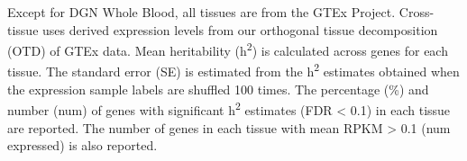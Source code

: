 \documentclass[10pt,letterpaper]{article}
\begin{document}
\begin{table}[!ht]
\begin{adjustwidth}{-2.25in}{0in}
\begin{tabular}{lrlrrr}
\end{tabular}
\begin{flushleft} Except for DGN Whole Blood, all tissues are from the GTEx Project. Cross-tissue uses derived expression levels from our orthogonal tissue decomposition (OTD) of GTEx data. Mean heritability (h\textsuperscript{2}) is calculated across genes for each tissue. The standard error (SE) is estimated from the h\textsuperscript{2} estimates obtained when the expression sample labels are shuffled 100 times. The percentage (\%) and number (num) of genes with significant h\textsuperscript{2} estimates (FDR \textless{} 0.1) in each tissue are reported. The number of genes in each tissue with mean RPKM \textgreater{} 0.1 (num expressed) is also reported.
\end{flushleft}
\label{table-h2}
\end{adjustwidth}
\end{table}

\clearpage

 

 
\end{document}
